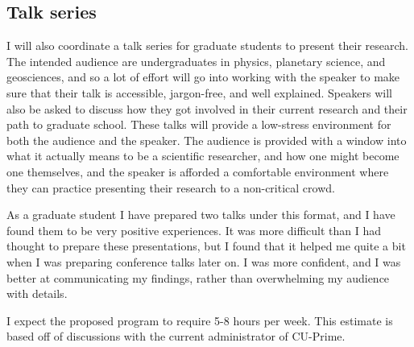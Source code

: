\documentclass[12pt]{article}
\begin{document}
\subsection*{Talk series}
I will also coordinate a talk series for graduate students to present their research. The intended audience are undergraduates in physics, planetary science, and geosciences, and so a lot of effort will go into working with the speaker to make sure that their talk is accessible, jargon-free, and well explained. Speakers will also be asked to discuss how they got involved in their current research and their path to graduate school. These talks will provide a low-stress environment for both the audience and the speaker.
The audience is provided with a window into what it actually means to be a scientific researcher, and how one might become one themselves, and the speaker is afforded a comfortable environment where they can practice presenting their research to a non-critical crowd.

As a graduate student I have prepared two talks under this format, and I have found them to be very positive experiences. It was more difficult than I had thought to prepare these presentations, but I found that it helped me quite a bit when I was preparing conference talks later on. I was more confident, and I was better at communicating my findings, rather than overwhelming my audience with details. 

I expect the proposed program to require 5-8 hours per week. This estimate is based off of discussions with the current administrator of CU-Prime. 

\begin{spacing}{0.4}

\printbibliography

\end{spacing}
\end{document}
